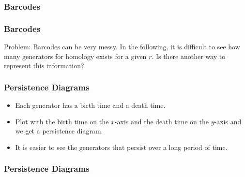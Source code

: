 \begin{frame}
\frametitle{Barcodes}
\begin{figure}
\end{figure}
\end{frame}

\begin{frame}
\frametitle{Barcodes}
Problem: Barcodes can be very messy. In the following, it is difficult to see how many generators for homology exists for a given $r$. Is there another way to  represent this information?
\begin{figure}
\end{figure}
\end{frame}

\begin{frame}
\frametitle{Persistence Diagrams}
\begin{itemize}
\item<1-> Each generator has a birth time and a death time.
\item<2-> Plot with the birth time on the $x$-axis and the death time on the $y$-axis and we get a persistence diagram.
\item<3-> It is easier to see the generators that persist over a long period of time.
\end{itemize}
\end{frame}

\begin{frame}
\frametitle{Persistence Diagrams}
\begin{figure}
\end{figure}
\end{frame}

